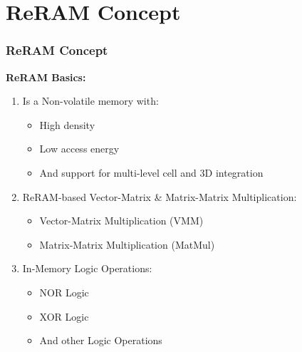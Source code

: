 \documentclass[
	12pt, %
]{beamer}
\begin{document}
\section{ReRAM Concept}
\begin{frame}
	\frametitle{ReRAM Concept}
	
	\textbf{ReRAM Basics:}
	
	\begin{enumerate}
		\item Is a Non-volatile memory with:
		\begin{itemize}
			\item High density
			\item Low access energy
			\item And support for multi-level cell and 3D integration
		\end{itemize}
		
		\item 
		ReRAM-based Vector-Matrix \& Matrix-Matrix Multiplication:
		\begin{itemize}
			\item Vector-Matrix Multiplication (VMM)
			\item Matrix-Matrix Multiplication (MatMul)
		\end{itemize}
		
		\item
		In-Memory Logic Operations:
		\begin{itemize}
			\item NOR Logic
			\item XOR Logic
			\item And other Logic Operations
		\end{itemize}
	\end{enumerate}	
\end{frame}
\end{document}
